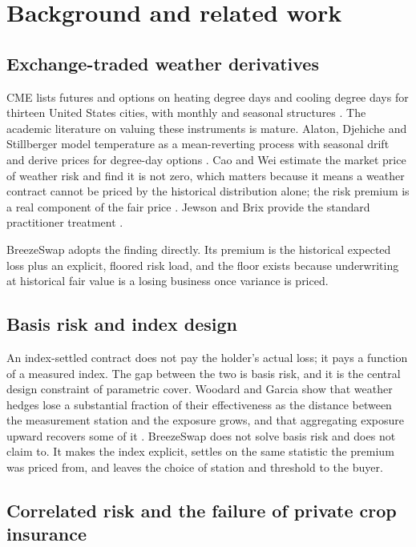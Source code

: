 \documentclass[11pt,a4paper]{article}
\begin{document}
\section{Background and related work}
\label{sec:related}

\subsection{Exchange-traded weather derivatives}

CME lists futures and options on heating degree days and cooling degree days for thirteen
United States cities, with monthly and seasonal structures \cite{cme_overview}. The academic
literature on valuing these instruments is mature. Alaton, Djehiche and Stillberger model
temperature as a mean-reverting process with seasonal drift and derive prices for degree-day
options \cite{alaton2002}. Cao and Wei estimate the market price of weather risk and find it
is not zero, which matters because it means a weather contract cannot be priced by the
historical distribution alone; the risk premium is a real component of the fair price
\cite{cao2004}. Jewson and Brix provide the standard practitioner treatment \cite{jewson2005}.

BreezeSwap adopts the finding directly. Its premium is the historical expected loss plus an
explicit, floored risk load, and the floor exists because underwriting at historical fair
value is a losing business once variance is priced.

\subsection{Basis risk and index design}

An index-settled contract does not pay the holder's actual loss; it pays a function of a
measured index. The gap between the two is basis risk, and it is the central design
constraint of parametric cover. Woodard and Garcia show that weather hedges lose a
substantial fraction of their effectiveness as the distance between the measurement station
and the exposure grows, and that aggregating exposure upward recovers some of it
\cite{woodard2008}. BreezeSwap does not solve basis risk and does not claim to. It makes
the index explicit, settles on the same statistic the premium was priced from, and leaves
the choice of station and threshold to the buyer.

\subsection{Correlated risk and the failure of private crop insurance}
\end{document}
